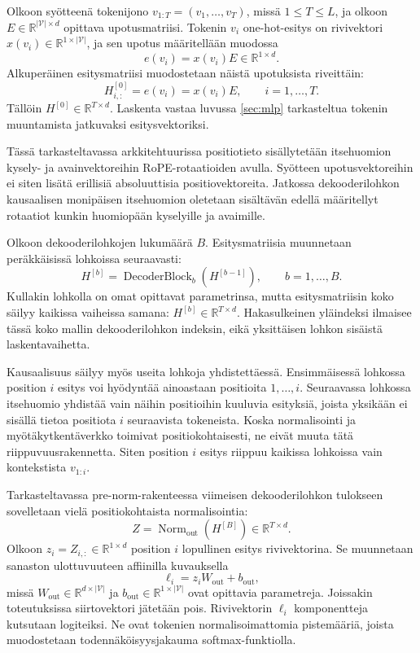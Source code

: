 Olkoon syötteenä tokenijono
\(v_{1:T}=(v_1,\dots,v_T)\), missä \(1 \le T \le L\), ja olkoon
\(E \in \mathbb{R}^{|\mathcal{V}| \times d}\) opittava
upotusmatriisi. Tokenin \(v_i\) one-hot-esitys on rivivektori
\(x(v_i) \in \mathbb{R}^{1 \times |\mathcal{V}|}\), ja sen
upotus määritellään muodossa
$$
e(v_i)=x(v_i)E \in \mathbb{R}^{1 \times d}.
$$
Alkuperäinen esitysmatriisi muodostetaan näistä upotuksista
riveittäin:
$$
H^{[0]}_{i,:}
=
e(v_i)
=
x(v_i)E,
\qquad
i=1,\dots,T.
$$
Tällöin \(H^{[0]} \in \mathbb{R}^{T \times d}\).
Laskenta vastaa luvussa \ref{sec:mlp} tarkasteltua tokenin
muuntamista jatkuvaksi esitysvektoriksi.

Tässä tarkasteltavassa arkkitehtuurissa positiotieto sisällytetään
itsehuomion kysely- ja avainvektoreihin RoPE-rotaatioiden avulla.
Syötteen upotusvektoreihin ei siten lisätä erillisiä absoluuttisia
positiovektoreita. Jatkossa dekooderilohkon kausaalisen monipäisen
itsehuomion oletetaan sisältävän edellä määritellyt rotaatiot
kunkin huomiopään kyselyille ja avaimille.

Olkoon dekooderilohkojen lukumäärä \(B\). Esitysmatriisia
muunnetaan peräkkäisissä lohkoissa seuraavasti:
$$
H^{[b]}
=
\operatorname{DecoderBlock}_b
\left(H^{[b-1]}\right),
\qquad
b=1,\dots,B.
$$
Kullakin lohkolla on omat opittavat parametrinsa, mutta
esitysmatriisin koko säilyy kaikissa vaiheissa samana:
\(H^{[b]} \in \mathbb{R}^{T \times d}\).
Hakasulkeinen yläindeksi ilmaisee tässä koko mallin
dekooderilohkon indeksin, eikä yksittäisen lohkon sisäistä
laskentavaihetta.

Kausaalisuus säilyy myös useita lohkoja yhdistettäessä.
Ensimmäisessä lohkossa position \(i\) esitys voi hyödyntää
ainoastaan positioita \(1,\dots,i\). Seuraavassa lohkossa
itsehuomio yhdistää vain näihin positioihin kuuluvia esityksiä,
joista yksikään ei sisällä tietoa positiota \(i\) seuraavista
tokeneista. Koska normalisointi ja myötäkytkentäverkko toimivat
positiokohtaisesti, ne eivät muuta tätä riippuvuusrakennetta.
Siten position \(i\) esitys riippuu kaikissa lohkoissa vain
kontekstista \(v_{1:i}\).

Tarkasteltavassa pre-norm-rakenteessa viimeisen dekooderilohkon
tulokseen sovelletaan vielä positiokohtaista normalisointia:
$$
Z
=
\operatorname{Norm}_{\mathrm{out}}
\left(H^{[B]}\right)
\in
\mathbb{R}^{T \times d}.
$$
Olkoon \(z_i = Z_{i,:} \in \mathbb{R}^{1 \times d}\) position \(i\)
lopullinen esitys rivivektorina. Se muunnetaan sanaston
ulottuvuuteen affiinilla kuvauksella
$$
\ell_i
=
z_i W_{\mathrm{out}} + b_{\mathrm{out}},
$$
missä
\(W_{\mathrm{out}} \in \mathbb{R}^{d \times |\mathcal{V}|}\)
ja \(b_{\mathrm{out}} \in \mathbb{R}^{1 \times |\mathcal{V}|}\)
ovat opittavia parametreja. Joissakin toteutuksissa siirtovektori
jätetään pois. Rivivektorin \(\ell_i\) komponentteja kutsutaan
logiteiksi. Ne ovat tokenien normalisoimattomia pistemääriä,
joista muodostetaan todennäköisyysjakauma softmax-funktiolla.

